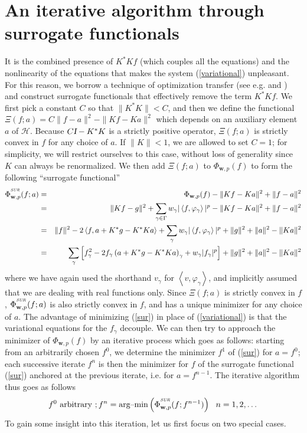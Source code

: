 \documentclass[10pt]{article}
\def\I{\sl {I}}
\def\cH{\mathcal{H}}
\def\K{K^*}
\def\SUR{\mbox{\tiny{\it{SUR}}}}
\def\fg{f_{\gamma}}
\def\ag{w_{\gamma}}
\def\vpg{\varphi_{\gamma}}
\newcommand\eref[1]{(\ref{#1})}
\begin{document}
\section{An iterative algorithm through
surrogate functionals}
It is the combined presence of $\K Kf$ (which couples all the equations)
and the nonlinearity of the equations that makes the system
\eref{variational} unpleasant. For this reason, we borrow a technique
of optimization transfer (see e.g. \cite{Lan00} and \cite{DeP95}) and
construct surrogate functionals that effectively remove the term $\K Kf$. We
first pick a constant $C$ so that $ \|\K K \| < C$, and then
we define the functional $\Xi(f;a)=
C\|f-a\|^2-\|Kf-Ka\|^2$ which depends on an auxiliary element $a$ of
$\cH$.
Because $C\mbox{\I} - \K K$ is a strictly positive operator, $\Xi(f;a)$ is
strictly convex in $f$ for any choice of $a$. If $\|K\|<1$,
we are allowed to set $C=1$; for simplicity, we will restrict ourselves
to this case, without loss of generality since
$K$ can always be renormalized.
We then add  $\Xi(f ; a)$ to $\Phi_{\mathbf{w},p}(f)$ to form the following
``surrogate functional''
\begin{eqnarray}
\label{sur}
{\Phi}^{^{\SUR}}_{\mathbf{w},p}(f ; a)&=& \Phi_{\mathbf{w},p}(f)
- \|Kf-Ka\|^2 +  \|f-a\|^2 \nonumber \\
&=& \|Kf-g\|^2 + \sum_{\gamma \in \Gamma} \ag |\left< f,
\vpg \right>|^p -  \|Kf-Ka\|^2 +  \|f-a\|^2 \nonumber \\
&=& \|f\|^2 - 2\left<f, a+\K g  - \K K a \right> + \sum_{\gamma}
\ag | \left< f, \vpg \right>|^p + \|g\|^2 + \|a\|^2 - \| K a
\|^2\nonumber \\ &=& \sum_{\gamma} \left[ \fg^2 -2 \fg
\left(a +\K g  - \K K a \right)_{\gamma} + \ag |\fg|^p
\right] + \|g\|^2 + \|a\|^2 - \| K a \|^2
\end{eqnarray}
where we have again used the shorthand $v_{\gamma}$ for $\left<v,\varphi_
{\gamma} \right>$, and implicitly assumed
that we are dealing with real functions only.
Since $\Xi(f;a)$ is strictly convex in $f$,
${\Phi}^{^{\SUR}}_{\mathbf{w},p}(f ; a)$ is also strictly convex
in $f$, and has a unique minimizer for any choice of $a$. The advantage of
minimizing \eref{sur} in place of \eref{variational} is that the variational
equations for the $\fg$ decouple. We can then try to approach the minimizer
of $\Phi_{\mathbf{w},p}(f)$ by an iterative process which goes as follows:
starting from an arbitrarily chosen $f^0$, we determine the minimizer
$f^1$ of \eref{sur} for $a = f^0$; each successive iterate $f^n$ is then
the minimizer for $f$ of
the surrogate functional \eref{sur} anchored at the previous iterate, i.e. for
$a= f^{n-1}$. The iterative algorithm thus goes as follows
\begin{equation}
\label{iter}
f^0 {\mbox\ {\rm arbitrary}}\ ; f^n= \mbox{{\rm arg--min}}
\left({\Phi}^{^{\SUR}}_{\mathbf{w},p}(f ; f^{n-1})\right)\ \ n=1, 2,\dots
\end{equation}
To gain some insight into this iteration,
let us first focus on two special cases.
\end{document}
